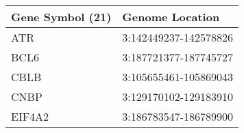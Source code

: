 \begin{tabular}{ll}
\toprule
Gene Symbol (21) &       Genome Location \\
\midrule
             ATR & 3:142449237-142578826 \\
            BCL6 & 3:187721377-187745727 \\
            CBLB & 3:105655461-105869043 \\
            CNBP & 3:129170102-129183910 \\
          EIF4A2 & 3:186783547-186789900 \\
\bottomrule
\end{tabular}
